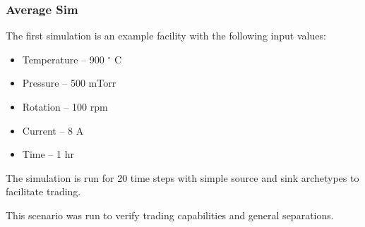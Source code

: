 \begin{frame}
\frametitle{Average Sim}
The first simulation is an example facility with the following input values:
\begin{itemize}
	\item Temperature -- 900 $^\circ$ C
	\item Pressure -- 500 mTorr
	\item Rotation -- 100 rpm
	\item Current -- 8 A
	\item Time -- 1 hr
\end{itemize}
The simulation is run for 20 time steps with simple source and sink archetypes to facilitate trading.

This scenario was run to verify trading capabilities and general separations.
\end{frame}

